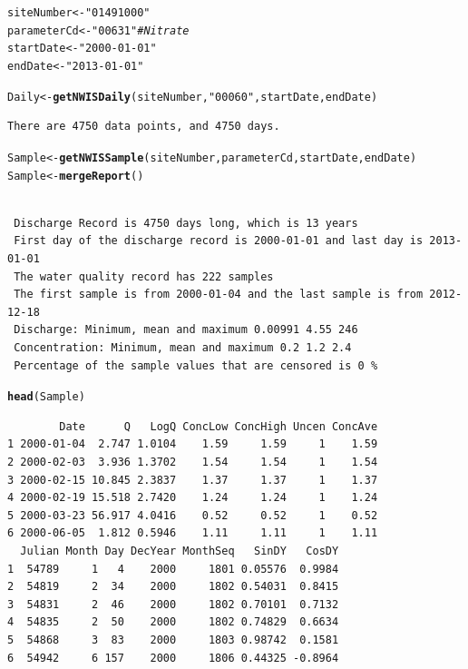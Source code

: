 \documentclass[a4paper,11pt]{article}\usepackage[]{graphicx}\usepackage[]{color}
\makeatletter
\newcommand{\hlstr}[1]{\textcolor[rgb]{0.192,0.494,0.8}{#1}}%
\newcommand{\hlcom}[1]{\textcolor[rgb]{0.678,0.584,0.686}{\textit{#1}}}%
\newcommand{\hlstd}[1]{\textcolor[rgb]{0.345,0.345,0.345}{#1}}%
\newcommand{\hlkwb}[1]{\textcolor[rgb]{0.69,0.353,0.396}{#1}}%
\newcommand{\hlkwd}[1]{\textcolor[rgb]{0.737,0.353,0.396}{\textbf{#1}}}%
\newenvironment{kframe}{%
 \def\at@end@of@kframe{}%
 \ifinner\ifhmode%
  \def\at@end@of@kframe{\end{minipage}}%
  \begin{minipage}{\columnwidth}%
 \fi\fi%
 \def\FrameCommand##1{\hskip\@totalleftmargin \hskip-\fboxsep
 \colorbox{shadecolor}{##1}\hskip-\fboxsep
     \hskip-\linewidth \hskip-\@totalleftmargin \hskip\columnwidth}%
 \MakeFramed {\advance\hsize-\width
   \@totalleftmargin\z@ \linewidth\hsize
   \@setminipage}}%
 {\par\unskip\endMakeFramed%
 \at@end@of@kframe}
\newenvironment{knitrout}{}{} %
\makeatother
\begin{document}
\begin{knitrout}
\color{fgcolor}\begin{kframe}
\begin{alltt}
\hlstd{siteNumber} \hlkwb{<-} \hlstr{"01491000"}
\hlstd{parameterCd} \hlkwb{<-} \hlstr{"00631"}  \hlcom{# Nitrate}
\hlstd{startDate} \hlkwb{<-} \hlstr{"2000-01-01"}
\hlstd{endDate} \hlkwb{<-} \hlstr{"2013-01-01"}

\hlstd{Daily} \hlkwb{<-} \hlkwd{getNWISDaily}\hlstd{(siteNumber,} \hlstr{"00060"}\hlstd{, startDate, endDate)}
\end{alltt}
\begin{verbatim}
There are 4750 data points, and 4750 days.
\end{verbatim}
\begin{alltt}
\hlstd{Sample} \hlkwb{<-} \hlkwd{getNWISSample}\hlstd{(siteNumber,parameterCd, startDate, endDate)}
\hlstd{Sample} \hlkwb{<-} \hlkwd{mergeReport}\hlstd{()}
\end{alltt}
\begin{verbatim}

 Discharge Record is 4750 days long, which is 13 years
 First day of the discharge record is 2000-01-01 and last day is 2013-01-01
 The water quality record has 222 samples
 The first sample is from 2000-01-04 and the last sample is from 2012-12-18
 Discharge: Minimum, mean and maximum 0.00991 4.55 246
 Concentration: Minimum, mean and maximum 0.2 1.2 2.4
 Percentage of the sample values that are censored is 0 %
\end{verbatim}
\begin{alltt}
\hlkwd{head}\hlstd{(Sample)}
\end{alltt}
\begin{verbatim}
        Date      Q   LogQ ConcLow ConcHigh Uncen ConcAve
1 2000-01-04  2.747 1.0104    1.59     1.59     1    1.59
2 2000-02-03  3.936 1.3702    1.54     1.54     1    1.54
3 2000-02-15 10.845 2.3837    1.37     1.37     1    1.37
4 2000-02-19 15.518 2.7420    1.24     1.24     1    1.24
5 2000-03-23 56.917 4.0416    0.52     0.52     1    0.52
6 2000-06-05  1.812 0.5946    1.11     1.11     1    1.11
  Julian Month Day DecYear MonthSeq   SinDY   CosDY
1  54789     1   4    2000     1801 0.05576  0.9984
2  54819     2  34    2000     1802 0.54031  0.8415
3  54831     2  46    2000     1802 0.70101  0.7132
4  54835     2  50    2000     1802 0.74829  0.6634
5  54868     3  83    2000     1803 0.98742  0.1581
6  54942     6 157    2000     1806 0.44325 -0.8964
\end{verbatim}
\end{kframe}
\end{knitrout}
\end{document}
